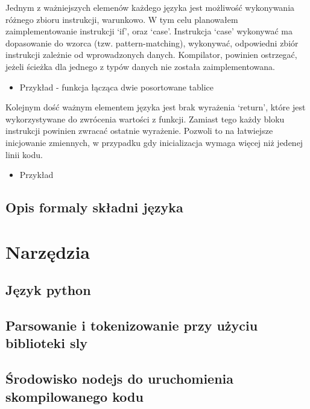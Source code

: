 \documentclass{article}
\begin{document}




Jednym z ważniejszych elemenów każdego języka jest możliwość wykonywania różnego zbioru instrukcji, warunkowo. W tym celu planowałem zaimplementowanie instrukcji `if', oraz `case'. Instrukcja `case' wykonywać ma dopasowanie do wzorca (tzw. pattern-matching), wykonywać, odpowiedni zbiór instrukcji zależnie od wprowadzonych danych. Kompilator, powinien ostrzegać, jeżeli ścieżka dla jednego z typów danych nie została zaimplementowana.

\begin{itemize}
  \newpage
  \item Przykład - funkcja łącząca dwie posortowane tablice
        
        
\end{itemize}

\newpage
Kolejnym dość ważnym elementem języka jest brak wyrażenia `return', które jest wykorzystywane do zwrócenia wartości z funkcji. Zamiast tego każdy bloku instrukcji powinien zwracać ostatnie wyrażenie. Pozwoli to na łatwiejsze inicjowanie zmiennych, w przypadku gdy inicializacja wymaga więcej niż jedenej linii kodu.


\begin{itemize}
  \item Przykład
    
    
\end{itemize}
\subsection{Opis formaly składni języka}
\section{Narzędzia}
\subsection{Język python}
\subsection{Parsowanie i tokenizowanie przy użyciu biblioteki sly}
\subsection{Środowisko nodejs do uruchomienia skompilowanego kodu}
\end{document}
